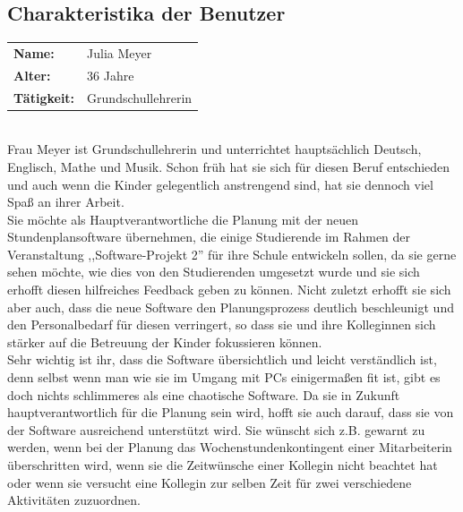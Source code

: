 \documentclass[fontsize=12pt,paper=a4,twoside]{scrartcl}
\begin{document}
\subsection{Charakteristika der Benutzer}

\begin{tabular}{p{3cm}l}
\textbf{Name:} & Julia Meyer \\
\textbf{Alter:} & 36 Jahre\\
\textbf{Tätigkeit:} &  Grundschullehrerin\\
\end{tabular} \\

Frau Meyer ist Grundschullehrerin und unterrichtet hauptsächlich Deutsch, Englisch, Mathe und Musik. Schon früh hat sie sich für diesen Beruf entschieden und auch wenn die Kinder gelegentlich anstrengend sind, hat sie dennoch viel Spaß an ihrer Arbeit.\\
Sie möchte als Hauptverantwortliche die Planung mit der neuen Stundenplansoftware übernehmen, die einige Studierende im Rahmen der Veranstaltung ,,Software-Projekt 2'' für ihre Schule entwickeln sollen, da sie gerne sehen möchte, wie dies von den Studierenden umgesetzt wurde und sie sich erhofft diesen hilfreiches Feedback geben zu können. Nicht zuletzt erhofft sie sich aber auch, dass die neue Software den Planungsprozess deutlich beschleunigt und den Personalbedarf für diesen verringert, so dass sie und ihre Kolleginnen sich stärker auf die Betreuung der Kinder fokussieren können.  \\
Sehr wichtig ist ihr, dass die Software übersichtlich und leicht verständlich ist, denn selbst wenn man wie sie im Umgang mit PCs einigermaßen fit ist, gibt es doch nichts schlimmeres als eine chaotische Software. Da sie in Zukunft hauptverantwortlich für die Planung sein wird, hofft sie auch darauf, dass sie von der Software ausreichend unterstützt wird. Sie wünscht sich z.B. gewarnt zu werden, wenn bei der Planung das Wochenstundenkontingent einer Mitarbeiterin überschritten wird, wenn sie die Zeitwünsche einer Kollegin nicht beachtet hat oder wenn sie versucht eine Kollegin zur selben Zeit für zwei verschiedene Aktivitäten zuzuordnen. \\
\end{document}

